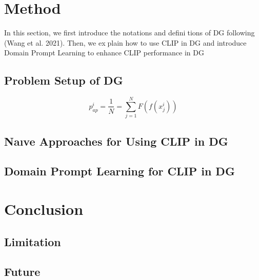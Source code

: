 \documentclass{article}
\begin{document}
\begin{multicols}{2}
  

\section{\centering Method}
In this section, we first introduce the notations and definitions of DG following (Wang et al. 2021). Then, we explain how to use CLIP in DG and introduce Domain Prompt
Learning to enhance CLIP performance in DG

\subsection{ Problem Setup of DG}

\begin{equation}
    p_{ap}^{i} = 
    \frac{1}{N} = \sum_{j=1}^{N}F(f(x_{j}^{i}))
\end{equation}


\subsection{ Naıve Approaches for Using CLIP in DG}
\subsection{Domain Prompt Learning for CLIP in DG
}
\section{\centering Conclusion}
\subsection{Limitation}
\subsection{Future}

\lipsum[2]

\end{multicols}
\end{document}
